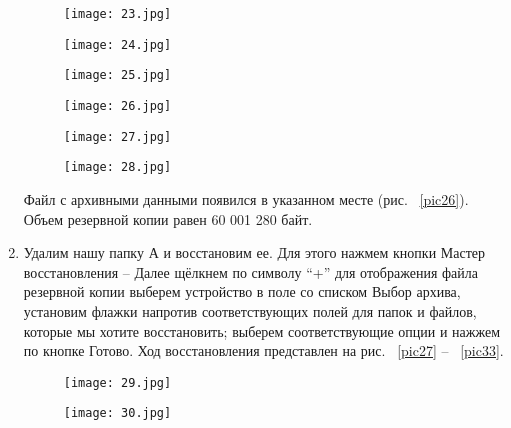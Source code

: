 \begin{enumerate}
\begin{figure}[h!t]
\begin{center}
\begin{minipage}[h]{0.4\linewidth}
  \texttt{[image: 23.jpg]}
  \caption{\label{pic23}}

  \bigskip
 
  \texttt{[image: 24.jpg]}
  \caption{\label{pic24}}

  \bigskip
    
  \texttt{[image: 25.jpg]}
  \caption{\label{pic25}}

  \bigskip
      
  \end{minipage}
  \hfill   
  \begin{minipage}[h!]{0.4\linewidth}

  \bigskip
    
  \texttt{[image: 26.jpg]}
  \caption{\label{pic26}}

  \bigskip
    
  \texttt{[image: 27.jpg]}
  \caption{\label{pic27}}

  \bigskip
    
  \texttt{[image: 28.jpg]}
  \caption{\label{pic28}}
    
  \end{minipage}          
  \end{center}
\end{figure}



Файл с архивными данными появился в указанном месте (рис. ~\ref{pic26}). Объем резервной копии равен 60 001 280 байт.

\item
  Удалим нашу папку А и восстановим ее. Для этого нажмем кнопки Мастер восстановления -- Далее щёлкнем по символу ``+'' для отображения файла резервной копии выберем устройство в поле со списком Выбор архива, установим флажки напротив соответствующих полей для папок и файлов, которые мы хотите восстановить; выберем соответствующие опции и нажжем по кнопке Готово. Ход восстановления представлен на рис. ~\ref{pic27} -- ~\ref{pic33}.

\begin{figure}[h!t] 
  \begin{center}
  \begin{minipage}[h]{0.4\linewidth}

  \texttt{[image: 29.jpg]}
  \caption{\label{pic29}}  

  \bigskip
  
  \texttt{[image: 30.jpg]}
  \caption{\label{pic30}}


\end{minipage}
\end{center}
\end{figure}
\end{enumerate}
